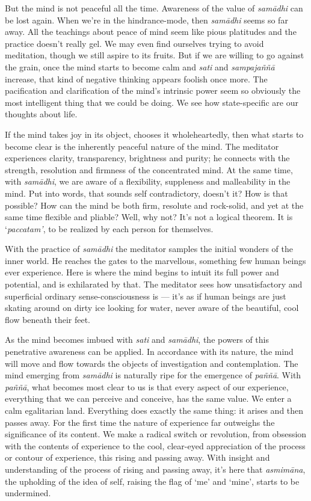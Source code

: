 But the mind is not peaceful all the time. Awareness of the value of
\emph{samādhi} can be lost again. When we're in the hindrance-mode, then
\emph{samādhi} seems so far away. All the teachings about peace of mind
seem like pious platitudes and the practice doesn't really gel. We may
even find ourselves trying to avoid meditation, though we still aspire
to its fruits. But if we are willing to go against the grain, once the
mind starts to become calm and \emph{sati} and \emph{sampajaññā}
increase, that kind of negative thinking appears foolish once more. The
pacification and clarification of the mind's intrinsic power seem so
obviously the most intelligent thing that we could be doing. We see how
state-specific are our thoughts about life.

If the mind takes joy in its object, chooses it wholeheartedly, then
what starts to become clear is the inherently peaceful nature of the
mind. The meditator experiences clarity, transparency, brightness and
purity; he connects with the strength, resolution and firmness of the
concentrated mind. At the same time, with \emph{samādhi}, we are aware
of a flexibility, suppleness and malleability in the mind. Put into
words, that sounds self contradictory, doesn't it? How is that possible?
How can the mind be both firm, resolute and rock-solid, and yet at the
same time flexible and pliable? Well, why not? It's not a logical
theorem. It is `\emph{paccatam'}, to be realized by each person for
themselves.

With the practice of \emph{samādhi} the meditator samples the initial
wonders of the inner world. He reaches the gates to the marvellous,
something few human beings ever experience. Here is where the mind
begins to intuit its full power and potential, and is exhilarated by
that. The meditator sees how unsatisfactory and superficial ordinary
sense-consciousness is --- it's as if human beings are just skating
around on dirty ice looking for water, never aware of the beautiful,
cool flow beneath their feet.

As the mind becomes imbued with \emph{sati} and \emph{samādhi}, the
powers of this penetrative awareness can be applied. In accordance with
its nature, the mind will move and flow towards the objects of
investigation and contemplation. The mind emerging from \emph{samādhi}
is naturally ripe for the emergence of \emph{paññā}. With \emph{paññā},
what becomes most clear to us is that every aspect of our experience,
everything that we can perceive and conceive, has the same value. We
enter a calm egalitarian land. Everything does exactly the same thing:
it arises and then passes away. For the first time the nature of
experience far outweighs the significance of its content. We make a
radical switch or revolution, from obsession with the contents of
experience to the cool, clear-eyed appreciation of the process or
contour of experience, this rising and passing away. With insight and
understanding of the process of rising and passing away, it's here that
\emph{asmimāna}, the upholding of the idea of self, raising the flag of
`me' and `mine', starts to be undermined.

